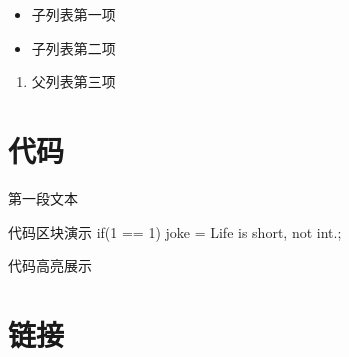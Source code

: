 \documentclass[letterpaper,10pt,english]{sphinxmanual}
\begin{document}
\begin{itemize}
\item {} 
\sphinxAtStartPar
子列表第一项

\item {} 
\sphinxAtStartPar
子列表第二项

\end{itemize}
\begin{enumerate}
%
\setcounter{enumi}{3}
\item {} 
\sphinxAtStartPar
父列表第三项

\end{enumerate}


\section{代码}
\label{\detokenize{rst-text:id8}}
\sphinxAtStartPar
{}

\sphinxAtStartPar
第一段文本

\begin{sphinxVerbatim}[commandchars=\\\{\}]
代码区块演示
if(1 == 1)\PYGZob{}
     \PYGZdl{}joke = \PYGZdq{}Life is short, not int.\PYGZdq{};
 \PYGZcb{}
\end{sphinxVerbatim}

\sphinxAtStartPar
代码高亮展示

\begin{sphinxVerbatim}[commandchars=\\\{\}]
  
      
\end{sphinxVerbatim}

\begin{sphinxVerbatim}[commandchars=\\\{\}]
\end{sphinxVerbatim}


\section{链接}
\label{\detokenize{rst-text:id9}}
\sphinxAtStartPar
{}

\sphinxAtStartPar
{}
\end{document}
